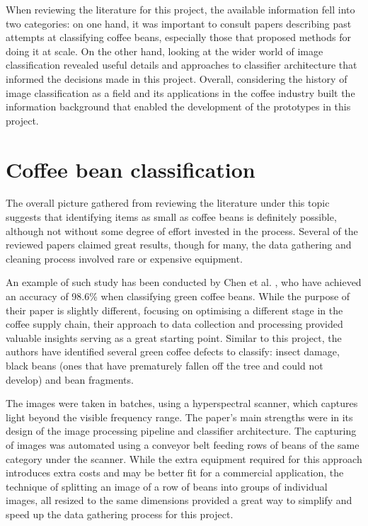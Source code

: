 When reviewing the literature for this project, the available information fell into two categories:
on one hand, it was important to consult papers describing past attempts at classifying coffee beans,
especially those that proposed methods for doing it at scale.
On the other hand, looking at the wider world of image classification revealed useful details and approaches to
classifier architecture that informed the decisions made in this project.
Overall, considering the history of image classification as a field and its applications in the coffee industry
built the information background that enabled the development of the prototypes in this project.

\section{Coffee bean classification}
\label{sec:lit-review-coffee}
The overall picture gathered from reviewing the literature under this topic suggests that identifying
items as small as coffee beans is definitely possible, although not without some degree of effort invested in the process.
Several of the reviewed papers claimed great results, though for many, the data gathering and cleaning process involved
rare or expensive equipment.

An example of such study has been conducted by Chen et al. \cite{hyperspectralChen}, who have achieved an accuracy of
98.6\% when classifying green coffee beans.
While the purpose of their paper is slightly different, focusing on optimising a different stage in the coffee supply chain,
their approach to data collection and processing provided valuable insights serving as a great starting point.
Similar to this project, the authors have identified several green coffee defects to classify: insect damage,
black beans (ones that have prematurely fallen off the tree and could not develop) and bean fragments.

The images were taken in batches, using a hyperspectral scanner,
which captures light beyond the visible frequency range.
The paper's main strengths were in its design of the image processing pipeline and classifier architecture.
The capturing of images was automated using a conveyor belt feeding rows of beans of the same category under the scanner.
While the extra equipment required for this approach introduces extra costs and may be better fit for a commercial application,
the technique of splitting an image of a row of beans into groups of individual images,
all resized to the same dimensions provided a great way to simplify and speed up the data gathering process for this project.

